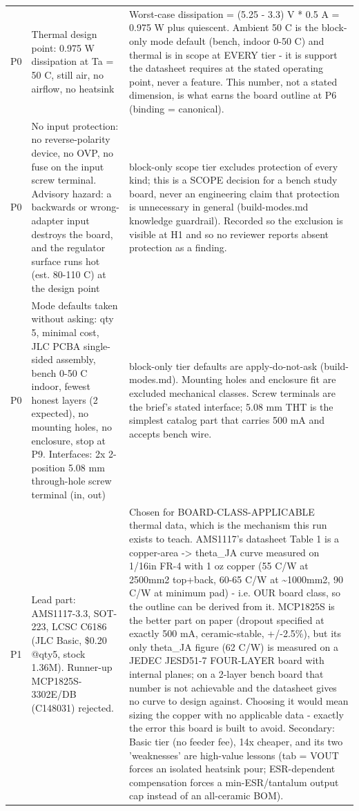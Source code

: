 \documentclass[11pt,a4paper]{article}
\begin{document}
{\begin{longtable}{lp{5.2cm}p{7.2cm}}
P0 & Thermal design point: 0.975 W dissipation at Ta = 50 C, still air, no airflow, no heatsink & Worst-case dissipation = (5.25 - 3.3) V {*} 0.5 A = 0.975 W plus quiescent. Ambient 50 C is the block-only mode default (bench, indoor 0-50 C) and thermal is in scope at EVERY tier - it is support the datasheet requires at the stated operating point, never a feature. This number, not a stated dimension, is what earns the board outline at P6 (binding = canonical). \\
P0 & No input protection: no reverse-polarity device, no OVP, no fuse on the input screw terminal. Advisory hazard: a backwards or wrong-adapter input destroys the board, and the regulator surface runs hot (est. 80-110 C) at the design point & block-only scope tier excludes protection of every kind; this is a SCOPE decision for a bench study board, never an engineering claim that protection is unnecessary in general (build-modes.md knowledge guardrail). Recorded so the exclusion is visible at H1 and so no reviewer reports absent protection as a finding. \\
P0 & Mode defaults taken without asking: qty 5, minimal cost, JLC PCBA single-sided assembly, bench 0-50 C indoor, fewest honest layers (2 expected), no mounting holes, no enclosure, stop at P9. Interfaces: 2x 2-position 5.08 mm through-hole screw terminal (in, out) & block-only tier defaults are apply-do-not-ask (build-modes.md). Mounting holes and enclosure fit are excluded mechanical classes. Screw terminals are the brief's stated interface; 5.08 mm THT is the simplest catalog part that carries 500 mA and accepts bench wire. \\
P1 & Lead part: AMS1117-3.3, SOT-223, LCSC C6186 (JLC Basic, \$0.20 @qty5, stock 1.36M). Runner-up MCP1825S-3302E/DB (C148031) rejected. & Chosen for BOARD-CLASS-APPLICABLE thermal data, which is the mechanism this run exists to teach. AMS1117's datasheet Table 1 is a copper-area -\textgreater{} theta\_JA curve measured on 1/16in FR-4 with 1 oz copper (55 C/W at 2500mm2 top+back, 60-65 C/W at \textasciitilde{}1000mm2, 90 C/W at minimum pad) - i.e. OUR board class, so the outline can be derived from it. MCP1825S is the better part on paper (dropout specified at exactly 500 mA, ceramic-stable, +/-2.5\%), but its only theta\_JA figure (62 C/W) is measured on a JEDEC JESD51-7 FOUR-LAYER board with internal planes; on a 2-layer bench board that number is not achievable and the datasheet gives no curve to design against. Choosing it would mean sizing the copper with no applicable data - exactly the error this board is built to avoid. Secondary: Basic tier (no feeder fee), 14x cheaper, and its two 'weaknesses' are high-value lessons (tab = VOUT forces an isolated heatsink pour; ESR-dependent compensation forces a min-ESR/tantalum output cap instead of an all-ceramic BOM). \\

\end{longtable}}
\end{document}
